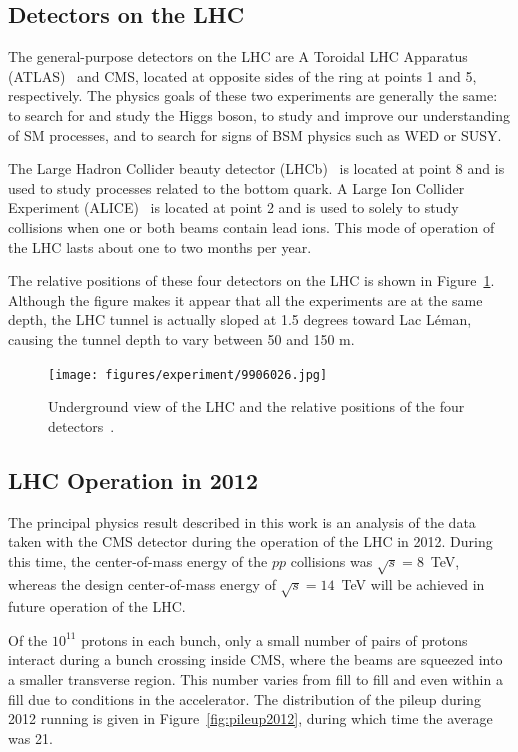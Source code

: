 \subsection{Detectors on the LHC\label{subsec:detectors}}

The general-purpose detectors on the LHC are A Toroidal LHC Apparatus (ATLAS)~\cite{cern-jinst-atlas}
and CMS, located at opposite sides of the ring at points 1 and 5, respectively. The physics
goals of these two experiments are generally the same: to search for and study the Higgs boson,
to study and improve our understanding of SM processes, and to search for signs of BSM physics such as
WED or SUSY.

The Large Hadron Collider beauty detector (LHCb)~\cite{cern-jinst-lhcb}
is located at point 8 and is used
to study processes related to the bottom quark. A Large Ion Collider Experiment
(ALICE)~\cite{cern-jinst-alice} is located
at point 2 and is used to solely to study collisions when one or both beams contain lead ions. This
mode of operation of the LHC lasts about one to two months per year.

The relative positions of these four detectors on the LHC is shown in Figure~\ref{fig:lhc_detectors}.
Although the figure makes it appear that all the experiments are at the same depth, the LHC tunnel is
actually sloped at 1.5 degrees toward Lac L\'{e}man,
causing the tunnel depth to vary between 50 and 150 m.

\begin{figure}[ht]
 \begin{center}
    \texttt{[image: figures/experiment/9906026.jpg]}
      \end{center}
\caption{Underground view of the LHC and the relative positions of the four detectors~\cite{Dailler:842399}.}
\label{fig:lhc_detectors}
\end{figure}

\subsection{LHC Operation in 2012}

The principal physics result described in this work is an analysis of the data taken with the
CMS detector during the operation of the LHC in 2012. During this time, the center-of-mass energy
of the $pp$ collisions was $\sqrt{s} = 8$~TeV, whereas the design center-of-mass energy of
$\sqrt{s} = 14$~TeV will be achieved in future operation of the LHC. 

Of the $10^{11}$ protons in each bunch, only a small number of pairs of protons interact during
a bunch crossing inside CMS, where the beams are squeezed into a smaller transverse region. This number
varies from fill to fill and even within a fill due to conditions in the accelerator. The distribution
of the pileup during 2012 running is given in Figure~\ref{fig:pileup2012}, during which time the
average was 21.

